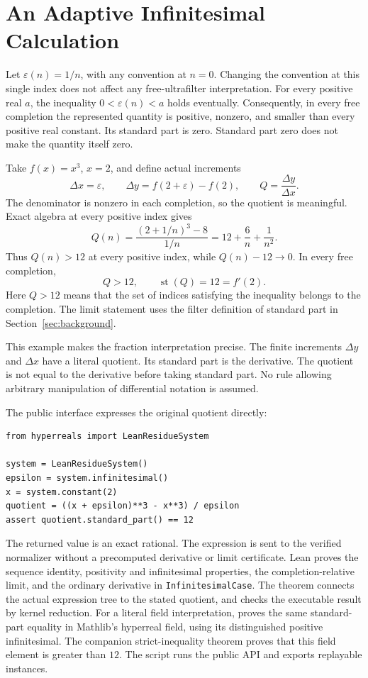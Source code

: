 \documentclass[11pt,a4paper]{article}
\theoremstyle{result}
\theoremstyle{definition}
\newcommand{\st}{\operatorname{st}}
\newcommand{\code}[1]{\texttt{#1}}
\begin{document}
\section{An Adaptive Infinitesimal Calculation}\label{sec:infinitesimal-case}

Let $\varepsilon(n)=1/n$, with any convention at $n=0$. Changing the convention at this single index does not affect any free-ultrafilter interpretation. For every positive real $a$, the inequality $0<\varepsilon(n)<a$ holds eventually. Consequently, in every free completion the represented quantity is positive, nonzero, and smaller than every positive real constant. Its standard part is zero. Standard part zero does not make the quantity itself zero.

Take $f(x)=x^3$, $x=2$, and define actual increments
\[
  \Delta x=\varepsilon,\qquad
  \Delta y=f(2+\varepsilon)-f(2),\qquad
  Q=\frac{\Delta y}{\Delta x}.
\]
The denominator is nonzero in each completion, so the quotient is meaningful. Exact algebra at every positive index gives
\begin{equation}\label{eq:cubic-quotient}
  Q(n)=\frac{(2+1/n)^3-8}{1/n}
      =12+\frac6n+\frac1{n^2}.
\end{equation}
Thus $Q(n)>12$ at every positive index, while $Q(n)-12\to0$. In every free completion,
\[
  Q>12,\qquad \st(Q)=12=f'(2).
\]
Here $Q>12$ means that the set of indices satisfying the inequality belongs to the completion. The limit statement uses the filter definition of standard part in Section~\ref{sec:background}.

This example makes the fraction interpretation precise. The finite increments $\Delta y$ and $\Delta x$ have a literal quotient. Its standard part is the derivative. The quotient is not equal to the derivative before taking standard part. No rule allowing arbitrary manipulation of differential notation is assumed.

The public interface expresses the original quotient directly:
\begin{lstlisting}
from hyperreals import LeanResidueSystem

system = LeanResidueSystem()
epsilon = system.infinitesimal()
x = system.constant(2)
quotient = ((x + epsilon)**3 - x**3) / epsilon
assert quotient.standard_part() == 12
\end{lstlisting}
The returned value is an exact rational. The expression is sent to the verified normalizer without a precomputed derivative or limit certificate. Lean proves the sequence identity, positivity and infinitesimal properties, the completion-relative limit, and the ordinary derivative in \code{InfinitesimalCase}. The theorem  connects the actual expression tree to the stated quotient, and  checks the executable result by kernel reduction. For a literal field interpretation,  proves the same standard-part equality in Mathlib's hyperreal field, using its distinguished positive infinitesimal. The companion strict-inequality theorem proves that this field element is greater than $12$. The script  runs the public API and exports replayable instances.
\end{document}
